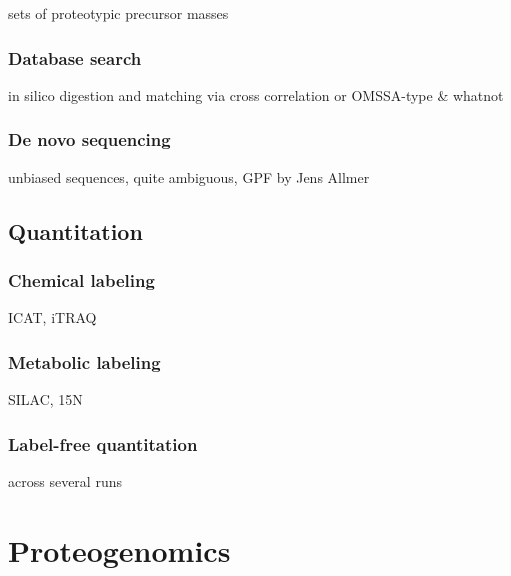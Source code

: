 \begin{todo}
sets of proteotypic precursor masses
\end{todo}

\subsubsection{Database search}

\begin{todo}
in silico digestion and matching via cross correlation or OMSSA-type & whatnot
\end{todo}

\subsubsection{De novo sequencing}

\begin{todo}
unbiased sequences, quite ambiguous, GPF by Jens Allmer
\end{todo}

\subsection{Quantitation}

\subsubsection{Chemical labeling}
 
\begin{todo}
ICAT, iTRAQ
\end{todo}

\subsubsection{Metabolic labeling}

\begin{todo}
SILAC, 15N
\end{todo}

\subsubsection{Label-free quantitation}

\begin{todo}
across several runs
\end{todo}

\section{Proteogenomics}

